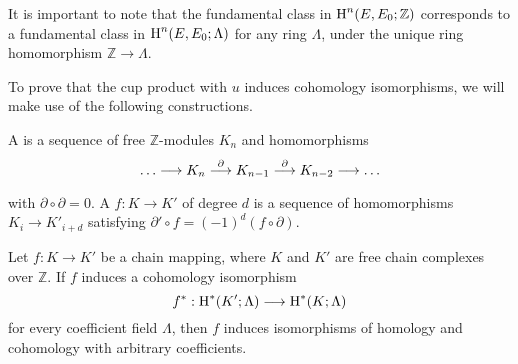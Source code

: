 \documentclass[../main]{subfiles}
\begin{document}
\begin{remark*}
It is important to note that the fundamental class in $\operatorname{H}^n(E, E_0; \mathbb Z)$ corresponds to a fundamental class in $\operatorname{H}^n(E, E_0; \Lambda)$ for any ring $\Lambda$, under the unique ring homomorphism $\mathbb Z \longrightarrow \Lambda$.
\end{remark*}

To prove that the cup product with $u$ induces cohomology isomorphisms, we will make use of the following constructions. 

\begin{definition}
A  is a sequence of free $\mathbb Z$-modules $K_n$ and homomorphisms \[\ldots \varrightarrow{} K_n \varrightarrow{\partial} K_{n - 1} \varrightarrow{\partial} K_{n - 2} \varrightarrow{} \ldots\] with $\partial \circ \partial = 0$. A  $f : K \longrightarrow K'$ of degree $d$ is a sequence of homomorphisms $K_i \longrightarrow K'_{i + d}$ satisfying $\partial' \circ f = (-1)^d (f \circ \partial)$. 
\end{definition}

\begin{lemma}
\label{lem:10.6}
Let $f : K \longrightarrow K'$ be a chain mapping, where $K$ and $K'$ are free chain complexes over $\mathbb Z$. If $f$ induces a cohomology isomorphism \[f^\ast : \operatorname{H}^\ast(K'; \Lambda) \longrightarrow \operatorname{H}^\ast(K; \Lambda)\] for every coefficient field $\Lambda$, then $f$ induces isomorphisms of homology and cohomology with arbitrary coefficients. 
\end{lemma}
\end{document}
